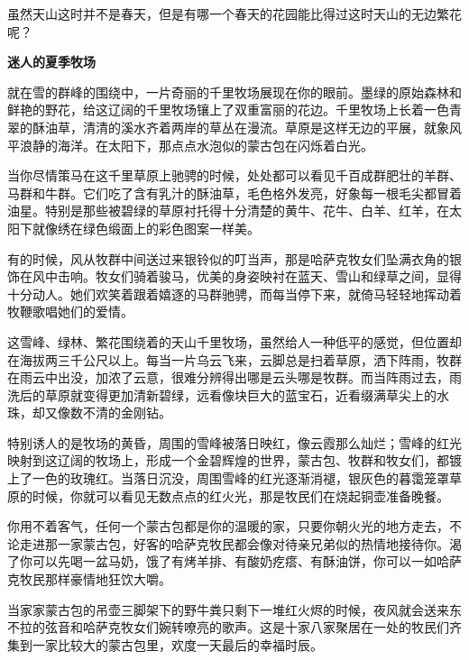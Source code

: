 \documentclass[12pt,UTF-8,openany]{ctexbook}
\begin{document}
\begin{large}
    虽然天山这时并不是春天，但是有哪一个春天的花园能比得过这时天山的无边繁花呢？
    
    \begin{center}
    
    \begin{large}\textbf{迷人的夏季牧场}\end{large}
    
    \end{center}
    
    就在雪的群峰的围绕中，一片奇丽的千里牧场展现在你的眼前。墨绿的原始森林和鲜艳的野花，给这辽阔的千里牧场镶上了双重富丽的花边。千里牧场上长着一色青翠的酥油草，清清的溪水齐着两岸的草丛在漫流。草原是这样无边的平展，就象风平浪静的海洋。在太阳下，那点点水泡似的蒙古包在闪烁着白光。
    
    当你尽情策马在这千里草原上驰骋的时候，处处都可以看见千百成群肥壮的羊群、马群和牛群。它们吃了含有乳汁的酥油草，毛色格外发亮，好象每一根毛尖都冒着油星。特别是那些被碧绿的草原衬托得十分清楚的黄牛、花牛、白羊、红羊，在太阳下就像绣在绿色缎面上的彩色图案一样美。
    
    有的时候，风从牧群中间送过来银铃似的叮当声，那是哈萨克牧女们坠满衣角的银饰在风中击响。牧女们骑着骏马，优美的身姿映衬在蓝天、雪山和绿草之间，显得十分动人。她们欢笑着跟着嬉逐的马群驰骋，而每当停下来，就倚马轻轻地挥动着牧鞭歌唱她们的爱情。
    
    这雪峰、绿林、繁花围绕着的天山千里牧场，虽然给人一种低平的感觉，但位置却在海拔两三千公尺以上。每当一片乌云飞来，云脚总是扫着草原，洒下阵雨，牧群在雨云中出没，加浓了云意，很难分辨得出哪是云头哪是牧群。而当阵雨过去，雨洗后的草原就变得更加清新碧绿，远看像块巨大的蓝宝石，近看缀满草尖上的水珠，却又像数不清的金刚钻。
    
    特别诱人的是牧场的黄昏，周围的雪峰被落日映红，像云霞那么灿烂；雪峰的红光映射到这辽阔的牧场上，形成一个金碧辉煌的世界，蒙古包、牧群和牧女们，都镀上了一色的玫瑰红。当落日沉没，周围雪峰的红光逐渐消褪，银灰色的暮霭笼罩草原的时候，你就可以看见无数点点的红火光，那是牧民们在烧起铜壶准备晚餐。
    
    你用不着客气，任何一个蒙古包都是你的温暖的家，只要你朝火光的地方走去，不论走进那一家蒙古包，好客的哈萨克牧民都会像对待亲兄弟似的热情地接待你。渴了你可以先喝一盆马奶，饿了有烤羊排、有酸奶疙瘩、有酥油饼，你可以一如哈萨克牧民那样豪情地狂饮大嚼。
    
    当家家蒙古包的吊壶三脚架下的野牛粪只剩下一堆红火烬的时候，夜风就会送来东不拉的弦音和哈萨克牧女们婉转嘹亮的歌声。这是十家八家聚居在一处的牧民们齐集到一家比较大的蒙古包里，欢度一天最后的幸福时辰。
    

\end{large}
\end{document}
